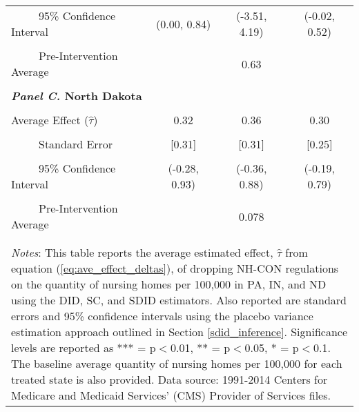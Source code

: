 \documentclass[../Main.tex]{subfiles}
\begin{document}
\begin{table}[htbp]
\begin{tabular}{l*{3}{c}}
\multicolumn{1}{l}{\ \ \ \ \ 95\% Confidence Interval}&   \multicolumn{1}{c}{(0.00, 0.84)}&   \multicolumn{1}{c}{(-3.51, 4.19)}&   \multicolumn{1}{c}{(-0.02, 0.52)}\\
\\[-2ex]
\multicolumn{1}{l}{\ \ \ \ \ Pre-Intervention Average}&   \multicolumn{3}{c}{0.63}\\
\\[-.1ex]
\multicolumn{4}{l}{\textbf{\textit{Panel C.} North Dakota}}\\
\\[-1.5ex]
\multicolumn{1}{l}{Average Effect ($\hat{\tau}$)}&   \multicolumn{1}{c}{0.32}&   \multicolumn{1}{c}{0.36}&  \multicolumn{1}{c}{0.30}\\
\\[-2ex]
\multicolumn{1}{l}{\ \ \ \ \ Standard Error}  &\multicolumn{1}{c}{[0.31]}&\multicolumn{1}{c}{[0.31]}&\multicolumn{1}{c}{[0.25]}\\
\\[-2ex]
\multicolumn{1}{l}{\ \ \ \ \ 95\% Confidence Interval}&   \multicolumn{1}{c}{(-0.28, 0.93)}&   \multicolumn{1}{c}{(-0.36, 0.88)}&   \multicolumn{1}{c}{(-0.19, 0.79)}\\
\\[-2ex]
\multicolumn{1}{l}{\ \ \ \ \ Pre-Intervention Average}&   \multicolumn{3}{c}{0.078}\\
\\[-.1ex]
\hline\hline
\\[-2ex]
\multicolumn{4}{p{.69\linewidth}}{\footnotesize \textit{Notes}: This table reports the average estimated effect, $\hat{\tau}$ from equation (\ref{eq:ave_effect_deltas}), of dropping NH-CON regulations on the quantity of nursing homes per 100,000 in PA, IN, and ND using the DID, SC, and SDID estimators. Also reported are standard errors and 95\% confidence intervals using the placebo variance estimation approach outlined in Section \ref{sdid_inference}. Significance levels are reported as *** = p$<$0.01, ** = p$<$0.05, * = p$<$0.1. The baseline average quantity of nursing homes per 100,000 for each treated state is also provided. Data source: 1991-2014 Centers for Medicare and Medicaid Services’ (CMS) Provider of Services files.}
\end{tabular}
\end{table}
\vfill
\clearpage
\end{document}

